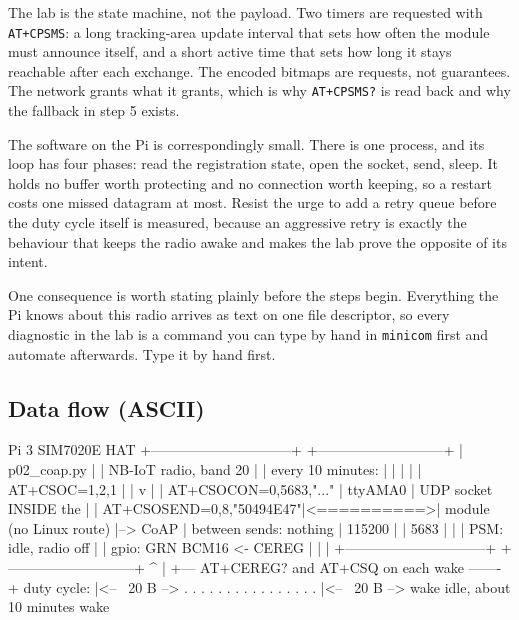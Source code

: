 The lab is the state machine, not the payload. Two timers are requested with \texttt{AT+CPSMS}: a long tracking-area update interval that sets how often the module must announce itself, and a short active time that sets how long it stays reachable after each exchange. The encoded bitmaps are requests, not guarantees. The network grants what it grants, which is why \texttt{AT+CPSMS?} is read back and why the fallback in step 5 exists.

The software on the Pi is correspondingly small. There is one process, and its loop has four phases: read the registration state, open the socket, send, sleep. It holds no buffer worth protecting and no connection worth keeping, so a restart costs one missed datagram at most. Resist the urge to add a retry queue before the duty cycle itself is measured, because an aggressive retry is exactly the behaviour that keeps the radio awake and makes the lab prove the opposite of its intent.

One consequence is worth stating plainly before the steps begin. Everything the Pi knows about this radio arrives as text on one file descriptor, so every diagnostic in the lab is a command you can type by hand in \texttt{minicom} first and automate afterwards. Type it by hand first.

\subsection*{Data flow (ASCII)}

\begin{asciiart}
  Pi 3                                        SIM7020E HAT
  +------------------------------+            +---------------------------+
  | p02_coap.py                  |            |  NB-IoT radio, band 20    |
  |   every 10 minutes:          |            |    |                      |
  |     AT+CSOC=1,2,1            |            |    v                      |
  |     AT+CSOCON=0,5683,"..."   |  ttyAMA0   | UDP socket INSIDE the     |
  |     AT+CSOSEND=0,8,"50494E47"|<==========>| module (no Linux route)   |--> CoAP
  |   between sends: nothing     |  115200    |                           |    5683
  |                              |            | PSM: idle, radio off      |
  | gpio: GRN BCM16 <- CEREG     |            |                           |
  +------------------------------+            +---------------------------+
        ^                                             |
        +--- AT+CEREG? and AT+CSQ on each wake -------+
  duty cycle:  |<-- ~20 B --> . . . . . . . . . . . . . . . . |<-- ~20 B -->
               wake           idle, about 10 minutes           wake
\end{asciiart}

